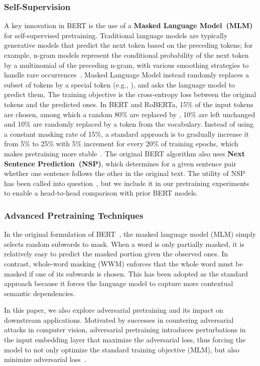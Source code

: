 \documentclass[acmlarge,screen,nonacm]{acmart}
\begin{document}
\subsubsection{Self-Supervision}
\label{subsec:bert-self-sup}
A key innovation in BERT \cite{devlin2018bert} is the use of a \textbf{Masked Language Model~(MLM)} for self-supervised pretraining. 
Traditional language models are typically generative models that predict the next token based on the preceding tokens; for example, n-gram models represent the conditional probability of the next token by a multinomial of the preceding n-gram, with various smoothing strategies to handle rare occurrences~\cite{kneser-ney}. 
Masked Language Model instead randomly replaces a subset of tokens by a special token (e.g., ), and asks the language model to predict them. 
The training objective is the cross-entropy loss between the original tokens and the predicted ones. In BERT and RoBERTa, 15\% of the input tokens are chosen, among which a random 80\% are replaced by , 10\% are left unchanged and 10\% are randomly replaced by a token from the vocabulary. 
Instead of using a constant masking rate of 15\%, a standard approach is to gradually increase it from 5\% to 25\% with 5\% increment for every 20\% of training epochs, which makes pretraining more stable~\cite{liu2020alum}.  
The original BERT algorithm also uses \textbf{Next Sentence Prediction~(NSP)}, which determines for a given sentence pair whether one sentence follows the other in the original text. The utility of NSP has been called into question~\cite{liu2019roberta}, but we include it in our pretraining experiments to enable a head-to-head comparison with prior BERT models.


\subsubsection{Advanced Pretraining Techniques}
In the original formulation of BERT~\cite{devlin2018bert}, the masked language model (MLM) simply selects random subwords to mask. When a word is only partially masked, it is relatively easy to predict the masked portion given the observed ones. In contrast, whole-word masking (WWM) enforces that the whole word must be masked if one of its subwords is chosen. This has been adopted as the standard approach because it forces the language model to capture more contextual semantic dependencies. 

In this paper, we also explore adversarial pretraining and its impact on downstream applications. Motivated by successes in countering adversarial attacks in computer vision, adversarial pretraining introduces perturbations in the input embedding layer that maximize the adversarial loss, thus forcing the model to not only optimize the standard training objective (MLM), but also minimize adversarial loss~\cite{liu2020alum}. 
\end{document}
